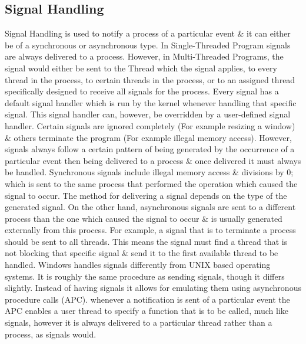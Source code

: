 \documentclass[a4paper,11pt]{article}
\begin{document}
\subsection{Signal Handling}
Signal Handling is used to notify a process of a particular event \& it can either be of a synchronous or asynchronous type. 
In Single-Threaded Program signals are always delivered to a process. However, in Multi-Threaded Programs, the signal would either be sent to the Thread which the signal applies, to every thread in the process, to certain threads in the process, or to an assigned thread specifically designed to receive all signals for the process.
\newline\indent Every signal has a default signal handler which is run by the kernel whenever handling that specific signal. This signal handler can, however, be overridden by a user-defined signal handler. Certain signals are ignored completely (For example resizing a window) \& others terminate the program (For example illegal memory access). However, signals always follow a certain pattern of being generated by the occurrence of a particular event then being delivered to a process \& once delivered it must always be handled.\cite{Operatingsystemconcepts}
\newline\indent Synchronous signals include illegal memory access \& divisions by 0; which is sent to the same process that performed the operation which caused the signal to occur. The method for delivering a signal depends on the type of the generated signal. On the other hand, asynchronous signals are sent to a different process than the one which caused the signal to occur \& is usually generated externally from this process. For example, a signal that is to terminate a process should be sent to all threads. This means the signal must find a thread that is not blocking that specific signal \& send it to the first available thread to be handled.
\newline\indent Windows handles signals differently from UNIX based operating systems. It is roughly the same procedure as sending signals, though it differs slightly. Instead of having signals it allows for emulating them using asynchronous procedure calls (APC). whenever a notification is sent of a particular event the APC enables a user thread to specify a function that is to be called, much like signals, however it is always delivered to a particular thread rather than a process, as signals would.\cite{Operatingsystemconcepts}
\end{document}

